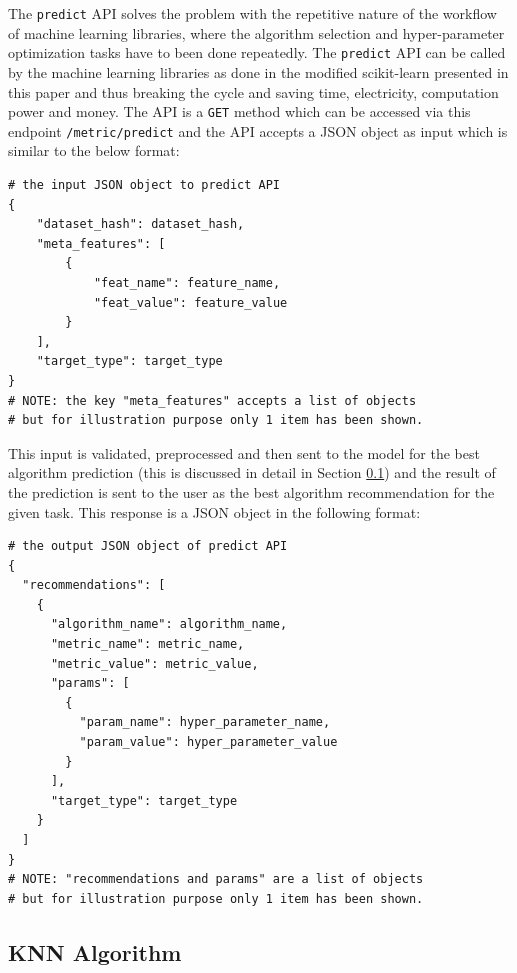 The \texttt{predict} API solves the problem with the repetitive nature of the workflow of machine learning libraries, where the algorithm selection and hyper-parameter optimization tasks have to been done repeatedly. The \texttt{predict} API can be called by the machine learning libraries as done in the modified scikit-learn presented in this paper and thus breaking the cycle and saving time, electricity, computation power and money. The API is a \texttt{GET} method which can be accessed via this endpoint \texttt{/metric/predict} and the API accepts a JSON object as input which is similar to the below format:

\begin{lstlisting}
# the input JSON object to predict API
{
	"dataset_hash": dataset_hash,
	"meta_features": [
		{
			"feat_name": feature_name,
			"feat_value": feature_value
		}
	],
	"target_type": target_type
}
# NOTE: the key "meta_features" accepts a list of objects
# but for illustration purpose only 1 item has been shown.
\end{lstlisting}

This input is validated, preprocessed and then sent to the model for the best algorithm prediction (this is discussed in detail in Section \ref{knn-model}) and the result of the prediction is sent to the user as the best algorithm recommendation for the given task. This response is a JSON object in the following format:

\begin{lstlisting}
# the output JSON object of predict API
{
  "recommendations": [
    {
      "algorithm_name": algorithm_name,
      "metric_name": metric_name,
      "metric_value": metric_value,
      "params": [
        {
          "param_name": hyper_parameter_name,
          "param_value": hyper_parameter_value
        }
      ],
      "target_type": target_type
    }
  ]
}
# NOTE: "recommendations and params" are a list of objects
# but for illustration purpose only 1 item has been shown.
\end{lstlisting}

\subsection{KNN Algorithm}
\label{knn-model}

